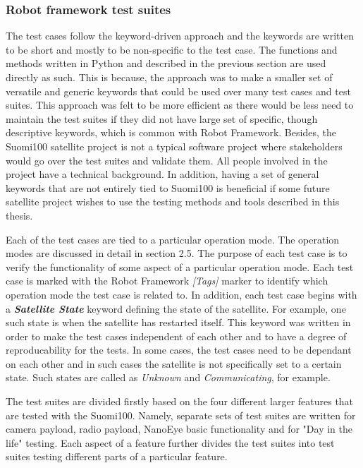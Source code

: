 \documentclass[english,12pt,a4paper,pdftex,elec,utf8]{aaltothesis}
\begin{document}
    
\subsubsection{Robot framework test suites}
The test cases follow the keyword-driven approach and the keywords are written to be short and mostly to be non-specific to the test case. The functions and methods written in Python and described in the previous section are used directly as such. This is because, the approach was to make a smaller set of versatile and generic keywords that could be used over many test cases and test suites. This approach was felt to be more efficient as there would be less need to maintain the test suites if they did not have large set of specific, though descriptive keywords, which is common with Robot Framework. Besides, the Suomi100 satellite project is not a typical software project where stakeholders would go over the test suites and validate them. All people involved in the project have a technical background. In addition, having a set of general keywords that are not entirely tied to Suomi100 is beneficial if some future satellite project wishes to use the testing methods and tools described in this thesis.\par
Each of the test cases are tied to a particular operation mode. The operation modes are discussed in detail in section 2.5. The purpose of each test case is to verify the functionality of some aspect of a particular operation mode. Each test case is marked with the Robot Framework \textit{[Tags]} marker to identify which operation mode the test case is related to.
In addition, each test case begins with a \textbf{\textit{Satellite State}} keyword defining the state of the satellite. For example, one such state is when the satellite has restarted itself. This keyword was written in order to make the test cases independent of each other and to have a degree of reproducability for the tests. In some cases, the test cases need to be dependant on each other and in such cases the satellite is not specifically set to a certain state. Such states are called as \textit{Unknown} and \textit{Communicating}, for example.\par 
The test suites are divided firstly based on the four different larger features that are tested with the Suomi100. Namely, separate sets of test suites are written for camera payload, radio payload, NanoEye basic functionality and for "Day in the life" testing. Each aspect of a feature further divides the test suites into test suites testing different parts of a  particular feature.\par   
\end{document}
